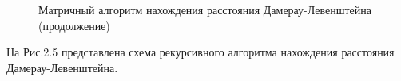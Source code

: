 \documentclass[a4paper,12pt]{report}
\begin{document}
\begin{figure}[ht!]
\caption{Матричный алгоритм нахождения расстояния Дамерау-Левенштейна (продолжение)}
\end{figure}
\newpage
\newpage
На Рис.2.5 представлена схема рекурсивного алгоритма нахождения расстояния Дамерау-Левенштейна.
\end{document}
